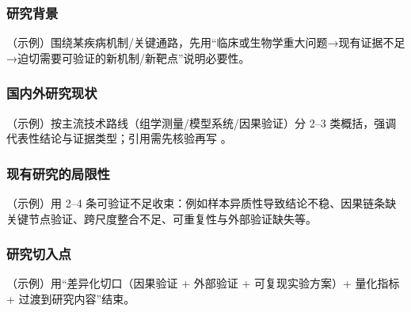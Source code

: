 
\subsubsection{研究背景}
\justifying\indent
（示例）围绕某疾病机制/关键通路，先用“临床或生物学重大问题→现有证据不足→迫切需要可验证的新机制/新靶点”说明必要性。

\subsubsection{国内外研究现状}
\indent
（示例）按主流技术路线（组学测量/模型系统/因果验证）分 2–3 类概括，强调代表性结论与证据类型；引用需先核验再写 \cite{...}。

\subsubsection{现有研究的局限性}
\indent
（示例）用 2–4 条可验证不足收束：例如样本异质性导致结论不稳、因果链条缺关键节点验证、跨尺度整合不足、可重复性与外部验证缺失等。

\subsubsection{研究切入点}
\indent
（示例）用“差异化切口（因果验证 + 外部验证 + 可复现实验方案）+ 量化指标 + 过渡到研究内容”结束。

